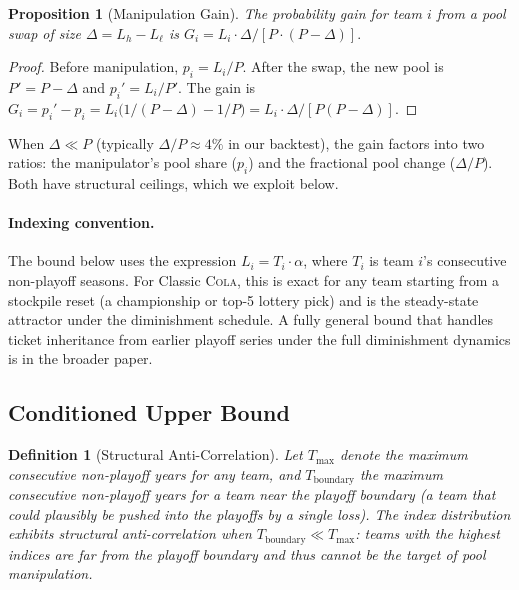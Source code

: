 \documentclass{article}
\newtheorem{proposition}[theorem]{Proposition}
\newtheorem{definition}{Definition}
\newcommand{\cola}{\textup{\textsc{Cola}}}
\begin{document}
\begin{proposition}[Manipulation Gain]
\label{prop:gain}
The probability gain for team $i$ from a pool swap of size $\Delta = L_h - L_\ell$ is
$
G_i = L_i \cdot \Delta / [P \cdot (P - \Delta)].
$
\end{proposition}

\begin{proof}
Before manipulation, $p_i = L_i / P$. After the swap, the new pool is $P' = P - \Delta$ and $p_i' = L_i / P'$. The gain is $G_i = p_i' - p_i = L_i \big( 1/(P - \Delta) - 1/P \big) = L_i \cdot \Delta / [P(P - \Delta)]$.
\end{proof}

When $\Delta \ll P$ (typically $\Delta / P \approx 4\%$ in our backtest), the gain factors into two ratios: the manipulator's pool share ($p_i$) and the fractional pool change ($\Delta / P$). Both have structural ceilings, which we exploit below.

\paragraph{Indexing convention.} The bound below uses the expression $L_i = T_i \cdot \alpha$, where $T_i$ is team $i$'s consecutive non-playoff seasons. For Classic \cola{}, this is exact for any team starting from a stockpile reset (a championship or top-5 lottery pick) and is the steady-state attractor under the diminishment schedule. A fully general bound that handles ticket inheritance from earlier playoff series under the full diminishment dynamics is in the broader paper.

\subsection{Conditioned Upper Bound}

\begin{definition}[Structural Anti-Correlation]
\label{def:anticorr}
Let $T_{\max}$ denote the maximum consecutive non-playoff years for any team, and $T_{\text{boundary}}$ the maximum consecutive non-playoff years for a team near the playoff boundary (a team that could plausibly be pushed into the playoffs by a single loss). The index distribution exhibits \emph{structural anti-correlation} when $T_{\text{boundary}} \ll T_{\max}$: teams with the highest indices are far from the playoff boundary and thus cannot be the target of pool manipulation.
\end{definition}
\end{document}
